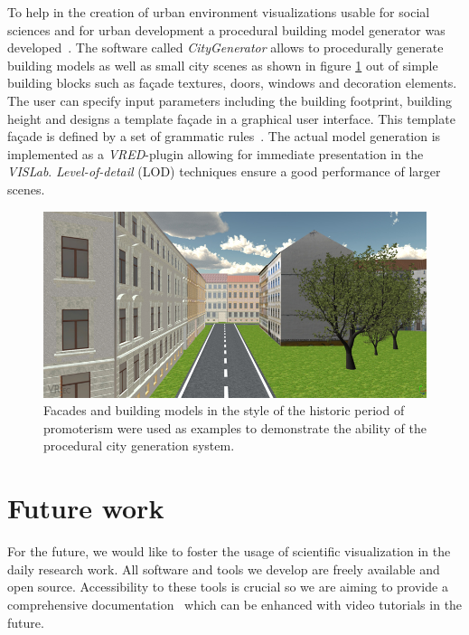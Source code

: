 \documentclass[twocolumn]{svjour3}          %
\begin{document}
To help in the creation of urban environment visualizations usable for social sciences and for urban development a procedural\cite{procedural:modelling} building model generator was developed~\cite{bilke:master}. The software called \emph{CityGenerator} allows to procedurally generate building models as well as small city scenes as shown in figure \ref{fig:city} out of simple building blocks such as fa\c{c}ade textures, doors, windows and decoration elements. The user can specify input parameters including the building footprint, building height and designs a template fa\c{c}ade in a graphical user interface. This template fa\c{c}ade is defined by a set of grammatic rules~\cite{procedural:buildings}. The actual model generation is implemented as a \emph{VRED}-plugin allowing for immediate presentation in the \emph{VISLab}. \emph{Level-of-detail} (LOD) techniques ensure a good performance of larger scenes.

\begin{figure}[htb]
  \includegraphics[width=\linewidth]{images/city.jpg}
\caption{Facades and building models in the style of the historic period of promoterism were used as examples to demonstrate the ability of the procedural city generation system.}
\label{fig:city}
\end{figure}

\section{Future work}
\label{future-work}

For the future, we would like to foster the usage of scientific visualization in the daily research work. All software and tools we develop are freely available and open source. Accessibility to these tools is crucial so we are aiming to provide a comprehensive documentation~\cite{web:ogs-docs} which can be enhanced with video tutorials in the future.
\end{document}

